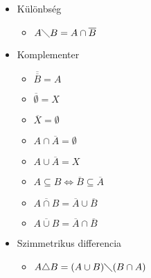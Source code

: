 \documentclass[margin=0px]{article}
\begin{document}
\begin{description}
\begin{itemize}
\begin{itemize}
                  \end{itemize}
            \item Különbség
                  \begin{itemize}
                      \item $A \diagdown B = A \cap \overline{B}$
                  \end{itemize}
            \item Komplementer
                  \begin{itemize}
                      \item $\overline{\overline{B}} = A$
                      \item $\overline{\emptyset} = X$
                      \item $\overline{X} = \emptyset$
                      \item $A \cap \overline{A} = \emptyset$
                      \item $A \cup \overline{A} = X$
                      \item $A \subseteq B \Longleftrightarrow \overline{B} \subseteq \overline{A}$
                      \item $\overline{A \cap B} = \overline{A} \cup \overline{B}$
                      \item $\overline{A \cup B} = \overline{A} \cap \overline{B}$
                  \end{itemize}
            \item Szimmetrikus differencia
                  \begin{itemize}
                      \item $A \triangle B = (A \cup B) \diagdown (B \cap A)$
                  \end{itemize}
        \end{itemize}
\end{description}
\end{document}
